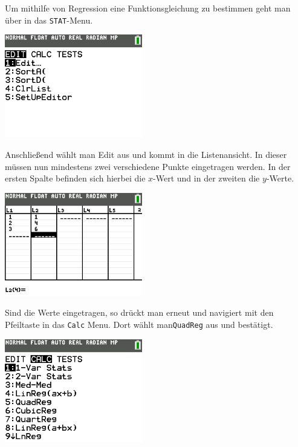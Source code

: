 \begin{paracol}{2}
\begin{flushleft}
	Um mithilfe von Regression eine Funktionsgleichung zu bestimmen geht man über  in das \texttt{STAT}-Menu.
\end{flushleft}	
\switchcolumn
\begin{flushright}
	\includegraphics[width=6cm]{Media/GRT/Visualisierung/Regression/Regression_1.png}
\end{flushright}
\end{paracol}

\begin{paracol}{2}
	\begin{flushleft}
	Anschließend wählt man Edit aus und kommt in die Listenansicht. In dieser müssen nun mindestens zwei verschiedene Punkte eingetragen werden. In der ersten Spalte befinden sich hierbei die $x$-Wert und in der zweiten die $y$-Werte. 
	\end{flushleft}	
\switchcolumn
	\begin{flushright}
		\includegraphics[width=6cm]{Media/GRT/Visualisierung/Regression/Regression_5.png}
	\end{flushright}
\end{paracol}

\begin{paracol}{2}
	\begin{flushleft}
	Sind die Werte eingetragen, so drückt man erneut  und navigiert mit den Pfeiltaste in das \texttt{Calc} Menu. Dort wählt man\texttt{QuadReg} aus und bestätigt.
	\end{flushleft}	
\switchcolumn
	\begin{flushright}
		\includegraphics[width=6cm]{Media/GRT/Visualisierung/Regression/Regression_3.png}
	\end{flushright}
\end{paracol}

